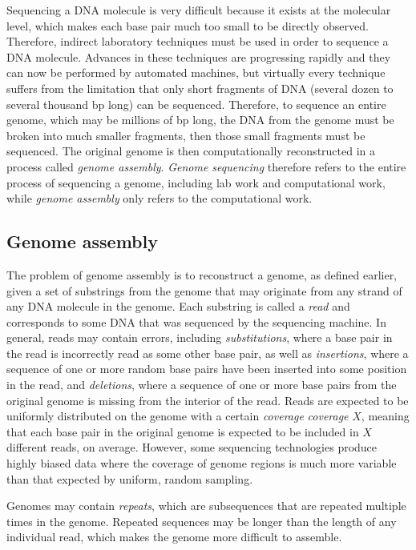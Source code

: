 \documentclass[10pt]{article}
\begin{document}
Sequencing a DNA molecule is very difficult because it exists at the molecular
level, which makes each base pair much too small to be directly observed.
Therefore, indirect laboratory techniques must be used in order to sequence a
DNA molecule.  Advances in these techniques are progressing rapidly and they can
now be performed by automated machines, but virtually every technique suffers
from the limitation that only short fragments of DNA (several dozen to several
thousand bp long) can be sequenced.  Therefore, to sequence an entire genome,
which may be millions of bp long, the DNA from the genome must be broken into
much smaller fragments, then those small fragments must be sequenced.  The
original genome is then computationally reconstructed in a process called {\it
genome assembly}.  {\it Genome sequencing} therefore refers to the entire
process of sequencing a genome, including lab work and computational work, while
{\it genome assembly} only refers to the computational work.

\subsection{Genome assembly}

\label{subsec:reads}

The problem of genome assembly is to reconstruct a genome, as defined earlier,
given a set of substrings from the genome that may originate from any strand of
any DNA molecule in the genome.  Each substring is called a {\it read} and
corresponds to some DNA that was sequenced by the sequencing machine.  In
general, reads may contain errors, including {\it substitutions}, where a base
pair in the read is incorrectly read as some other base pair, as well as {\it
insertions}, where a sequence of one or more random base pairs have been
inserted into some position in the read, and {\it deletions}, where a sequence
of one or more base pairs from the original genome is missing from the interior
of the read.  Reads are expected to be uniformly distributed on the genome with
a certain {\it coverage} {\it coverage} $X$, meaning that each base pair in the
original genome is expected to be included in $X$ different reads, on average.
However, some sequencing technologies produce highly biased data where the
coverage of genome regions is much more variable than that expected by uniform,
random sampling.

Genomes may contain {\it repeats}, which are subsequences that are repeated
multiple times in the genome.  Repeated sequences may be longer than the length
of any individual read, which makes the genome more difficult to assemble.
\end{document}
